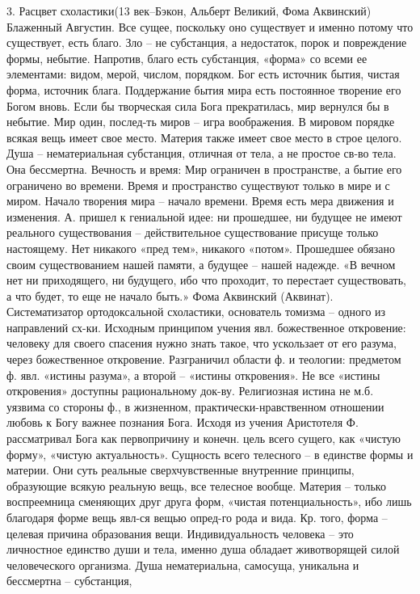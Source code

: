 \documentclass[12pt]{article}
\begin{document}
3. Расцвет схоластики(13 век–Бэкон, Альберт Великий, Фома Аквинский)
Блаженный Августин. Все сущее, поскольку оно существует и именно потому что существует, есть благо. Зло –
не субстанция, а недостаток, порок и повреждение формы, небытие. Напротив, благо есть субстанция, «форма»
со всеми ее элементами: видом, мерой, числом, порядком. Бог есть источник бытия, чистая форма, источник
блага. Поддержание бытия мира есть постоянное творение его Богом вновь. Если бы творческая сила Бога
прекратилась, мир вернулся бы в небытие. Мир один, послед-ть миров – игра воображения. В мировом порядке
всякая вещь имеет свое место. Материя также имеет свое место в строе целого.
Душа – нематериальная субстанция, отличная от тела, а не простое св-во тела. Она бессмертна.
Вечность и время: Мир ограничен в пространстве, а бытие его ограничено во времени. Время и пространство
существуют только в мире и с миром. Начало творения мира – начало времени. Время есть мера движения и
изменения. А. пришел к гениальной идее: ни прошедшее, ни будущее не имеют реального существования –
действительное  существование  присуще  только  настоящему.  Нет  никакого  «пред  тем»,  никакого  «потом».
Прошедшее обязано своим существованием нашей памяти, а будущее – нашей надежде. «В вечном нет ни
приходящего, ни будущего, ибо что проходит, то перестает существовать, а что будет, то еще не начало быть.»
Фома  Аквинский  (Аквинат).  Систематизатор  ортодоксальной  схоластики,  основатель  томизма  –  одного  из
направлений сх-ки. Исходным принципом учения явл. божественное откровение: человеку для своего спасения
нужно знать такое, что ускользает от его разума, через божественное откровение.
Разграничил области ф. и теологии: предметом ф. явл. «истины разума», а второй – «истины откровения». Не
все «истины откровения» доступны рациональному док-ву. Религиозная истина не м.б. уязвима со стороны ф., в
жизненном, практически-нравственном отношении любовь к Богу важнее познания Бога.
Исходя из учения Аристотеля Ф. рассматривал Бога как первопричину и конечн. цель всего сущего, как «чистую
форму», «чистую актуальность». Сущность всего телесного – в единстве формы и материи. Они суть реальные
сверхчувственные внутренние принципы, образующие всякую реальную вещь, все телесное вообще. Материя –
только воспреемница сменяющих друг друга форм, «чистая потенциальность», ибо лишь благодаря форме вещь
явл-ся вещью опред-го рода и вида. Кр. того, форма – целевая причина образования вещи.
Индивидуальность человека – это личностное единство души и тела, именно душа обладает животворящей
силой  человеческого  организма.  Душа  нематериальна,  самосуща,  уникальна  и  бессмертна  –  субстанция,
\end{document}
